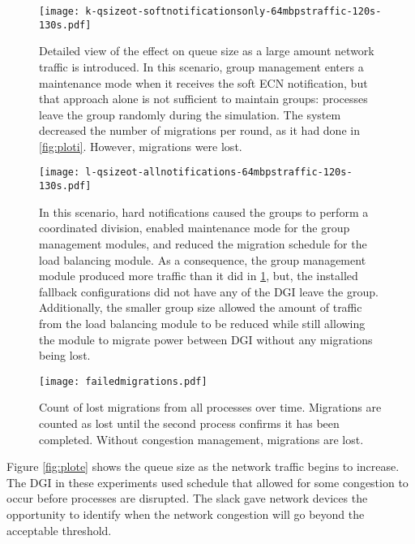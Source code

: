 \begin{figure}
\centering
\texttt{[image: k-qsizeot-softnotificationsonly-64mbpstraffic-120s-130s.pdf]}
\caption[Detailed view of the effect on queue size as a large amount network traffic is introduced.]{
Detailed view of the effect on queue size as a large amount network traffic is introduced.
In this scenario, group management enters a maintenance mode when it receives the soft \ac{ECN} notification, but that approach alone is not sufficient to maintain groups: processes leave the group randomly during the simulation.
The system decreased the number of migrations per round, as it had done in \ref{fig:ploti}.
However, migrations were lost.
}
\label{fig:plotk}
\centering
\end{figure}

\begin{figure}
\centering
\texttt{[image: l-qsizeot-allnotifications-64mbpstraffic-120s-130s.pdf]}
\caption[Effect on queue size as a large amount of network traffic is introduced.]
{
In this scenario, hard notifications caused the groups to perform a coordinated division, enabled maintenance mode for the group management modules, and reduced the migration schedule for the load balancing module.
As a consequence, the group management module produced more traffic than it did in \ref{fig:plotk}, but, the installed fallback configurations did not have any of the \ac{DGI} leave the group.
Additionally, the smaller group size allowed the amount of traffic from the load balancing module to be reduced while still allowing the module to migrate power between \ac{DGI} without any migrations being lost.
}
\label{fig:plotl}
\end{figure}

\begin{figure}
\centering
\texttt{[image: failedmigrations.pdf]}
\caption{Count of lost migrations from all processes over time. Migrations are counted as lost until the second process confirms it has been completed. Without congestion management, migrations are lost.}
\label{fig:plotg}
\end{figure}

Figure \ref{fig:plote} shows the queue size as the network traffic begins to increase.
The \ac{DGI} in these experiments used schedule that allowed for some congestion to occur before processes are disrupted.
The slack gave network devices the opportunity to identify when the network congestion will go beyond the acceptable threshold.

